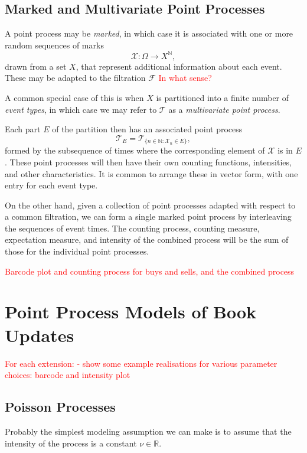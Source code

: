 \documentclass[honours,12pt]{unswthesis}
\numberwithin{equation}{section}
\begin{document}
\subsection{Marked and Multivariate Point Processes}

A point process  may be \textit{marked}, in which case it is associated with one or more random sequences of marks $$\mathcal{X}:\Omega\to X^\mathbb{N},$$
drawn from a set $X$, that represent additional information about each event. These may be adapted to the filtration $\mathcal{F}$ \textcolor{red}{In what sense?}

A common special case of this is when $X$ is partitioned into a finite number of \textit{event types}, in which case we may refer to $\mathcal{T}$ as a \textit{multivariate point process}.

Each part $E$ of the partition then has an associated point process $$\mathcal{T}_E = \mathcal{T}_{\{n\in\mathbb{N} : \mathcal{X}_n\in E\}},$$ formed by the subsequence of times where the corresponding element of $\mathcal{X}$ is in $E$. These point processes will then have their own counting functions, intensities, and other characteristics. It is common to arrange these in vector form, with one entry for each event type.

On the other hand, given a collection of point processes adapted with respect to a common filtration, we can form a single marked point process by interleaving the sequences of event times. The counting process, counting measure, expectation measure, and intensity of the combined process will be the sum of those for the individual point processes.

\textcolor{red}{Barcode plot and counting process for buys and sells, and the combined process}



\section{Point Process Models of Book Updates}

\textcolor{red}{
For each extension:
- show some example realisations for various parameter choices: barcode and intensity plot
}


\subsection{Poisson Processes}
Probably the simplest modeling assumption we can make is to assume that the intensity of the process is a constant $\nu\in\mathbb{R}$.
\end{document}
